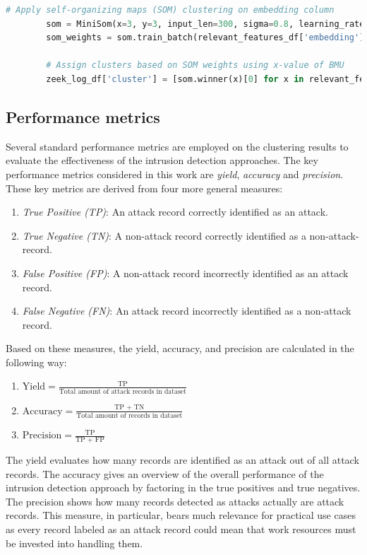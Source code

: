 \begin{minipage}\linewidth
	\begin{lstlisting}[language={python}, caption={Application of the SOM clustering approach on the previously calculated embeddings}, label={lst:som}] 
        # Apply self-organizing maps (SOM) clustering on embedding column
        som = MiniSom(x=3, y=3, input_len=300, sigma=0.8, learning_rate=0.2, random_seed=10)
        som_weights = som.train_batch(relevant_features_df['embedding'].tolist(), num_iteration=300)
        
        # Assign clusters based on SOM weights using x-value of BMU
        zeek_log_df['cluster'] = [som.winner(x)[0] for x in relevant_features_df['embedding'].tolist()]
	\end{lstlisting}
\end{minipage}

\subsection{Performance metrics}
\label{subsec:performance_metrics}

Several standard performance metrics are employed on the clustering results to evaluate the effectiveness of the intrusion detection approaches. The key performance metrics considered in this work are \emph{yield}, \emph{accuracy} and \emph{precision}. These key metrics are derived from four more general measures:
\begin{enumerate}
	\item \emph{True Positive (TP)}: An attack record correctly identified as an attack.
	\item \emph{True Negative (TN)}: A non-attack record correctly identified as a non-attack-record.
	\item \emph{False Positive (FP)}: A non-attack record incorrectly identified as an attack record.
	\item \emph{False Negative (FN)}: An attack record incorrectly identified as a non-attack record.
\end{enumerate}

Based on these measures, the yield, accuracy, and precision are calculated in the following way:
\begin{enumerate}
    \item $\text{Yield} = \frac{\text{TP}}{\text{Total amount of attack records in dataset}}$
    \item $\text{Accuracy} = \frac{\text{TP + TN}}{\text{Total amount of records in dataset}}$
    \item $\text{Precision} = \frac{\text{TP}}{\text{TP + FP}}$
\end{enumerate}
The yield evaluates how many records are identified as an attack out of all attack records. The accuracy gives an overview of the overall performance of the intrusion detection approach by factoring in the true positives and true negatives. The precision shows how many records detected as attacks actually are attack records. This measure, in particular, bears much relevance for practical use cases as every record labeled as an attack record could mean that work resources must be invested into handling them.



